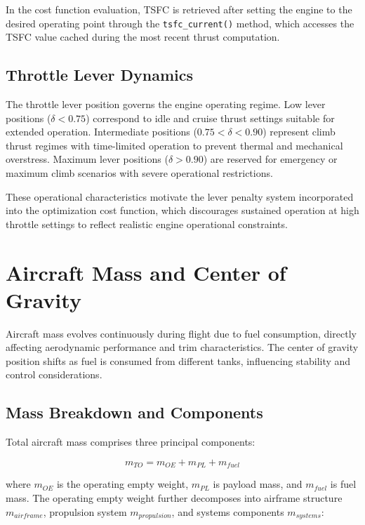 In the cost function evaluation, TSFC is retrieved after setting the engine to the desired operating point through the \texttt{tsfc\_current()} method, which accesses the TSFC value cached during the most recent thrust computation.

\subsection{Throttle Lever Dynamics}

The throttle lever position governs the engine operating regime. Low lever positions ($\delta < 0.75$) correspond to idle and cruise thrust settings suitable for extended operation. Intermediate positions ($0.75 < \delta < 0.90$) represent climb thrust regimes with time-limited operation to prevent thermal and mechanical overstress. Maximum lever positions ($\delta > 0.90$) are reserved for emergency or maximum climb scenarios with severe operational restrictions.

These operational characteristics motivate the lever penalty system incorporated into the optimization cost function, which discourages sustained operation at high throttle settings to reflect realistic engine operational constraints.

\section{Aircraft Mass and Center of Gravity}

Aircraft mass evolves continuously during flight due to fuel consumption, directly affecting aerodynamic performance and trim characteristics. The center of gravity position shifts as fuel is consumed from different tanks, influencing stability and control considerations.

\subsection{Mass Breakdown and Components}

Total aircraft mass comprises three principal components:

\begin{equation}
m_{TO} = m_{OE} + m_{PL} + m_{fuel}
\end{equation}

where $m_{OE}$ is the operating empty weight, $m_{PL}$ is payload mass, and $m_{fuel}$ is fuel mass. The operating empty weight further decomposes into airframe structure $m_{airframe}$, propulsion system $m_{propulsion}$, and systems components $m_{systems}$:

